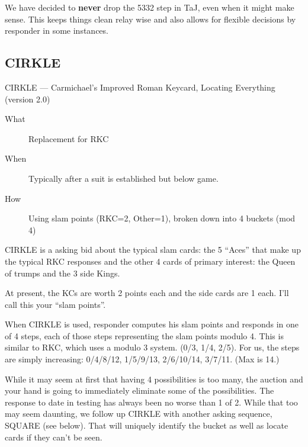 \documentclass[tom-ari]{subfile}
\begin{document}
\begin{noted}
  We have decided to \textbf{never} drop the 5332 step in TaJ, even when it might make sense.  This keeps things clean relay wise and also allows for flexible decisions by responder in some instances.
\end{noted}

\subsection{CIRKLE}
\label{CIRKLE}

CIRKLE --- Carmichael's Improved Roman Keycard, Locating Everything (version 2.0)
 
\normalsize


\begin{description}
	\item[What] Replacement for RKC
	\item[When] Typically after a suit is established but below game.
	\item[How] Using slam points (RKC=2, Other=1), broken down into 4 buckets (mod 4) 
\end{description}

CIRKLE is a asking bid about the typical slam cards:  the 5 ``Aces'' that make up the typical RKC responses and the other 4 cards of primary interest:  the Queen of trumps and the 3 side Kings.

At present, the KCs are worth 2 points each and the side cards are 1 each.  I'll call this your ``slam points''.

When CIRKLE is used, responder computes his slam points and responds in one of 4 steps, each of those steps representing the slam points modulo 4. This is similar to RKC, which uses a modulo 3 system.  (0/3, 1/4, 2/5).  For us, the steps are simply increasing:  0/4/8/12, 1/5/9/13, 2/6/10/14, 3/7/11. (Max is 14.)

While it may seem at first that having 4 possibilities is too many, the auction and your hand is going to immediately eliminate some of the possibilities.  The response to date in testing has always been no worse than 1 of 2.  While that too may seem daunting, we follow up CIRKLE with another asking sequence, SQUARE (see below).  That will uniquely identify the bucket as well as locate cards if they can't be seen.
\end{document}
